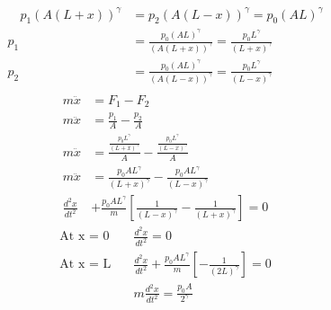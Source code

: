 \documentclass[]{article}
\begin{document}
{\begin{enumerate}
\begin{enumerate}
\begin{equation*}
\begin{split}
							\quad p_1 (A(L + x))^{\gamma} &= p_2 (A(L - x))^{\gamma} = p_0(AL)^{\gamma} \\
							p_1 &= \frac{p_0(AL)^{\gamma}}{(A(L + x))^{\gamma}} = \frac{p_0L^{\gamma}}{(L + x)^{\gamma}} \\
							p_2 &= \frac{p_0(AL)^{\gamma}}{(A(L - x))^{\gamma}} = \frac{p_0L^{\gamma}}{(L - x)^{\gamma}} \\
						\end{split}
					\end{equation*}
					\begin{equation*}
						\begin{split}
							m\ddot{x} &=  F_1 - F_2 \\
							m\ddot{x} &=  \frac{p_1}{A} - \frac{p_2}{A} \\
							m\ddot{x} &=  \frac{\frac{p_0L^{\gamma}}{(L + x)^{\gamma}}}{A} - \frac{\frac{p_0L^{\gamma}}{(L - x)^{\gamma}}}{A} \\
							m\ddot{x} &=  \frac{p_0AL^{\gamma}}{(L + x)^{\gamma}} - \frac{p_0AL^{\gamma}}{(L - x)^{\gamma}} \\
							\frac{d^2 x}{dt^2} &+ \frac{p_0 A L^{\gamma}}{m} \left[ \frac{1}{(L - x)^{\gamma}} - \frac{1}{(L + x)^{\gamma}} \right] = 0
						\end{split}
					\end{equation*}
					\begin{equation*}
						\begin{split}
							\text{At x = 0} \quad &\frac{d^2 x}{dt^2} = 0 \\
							\text{At x = L} \quad &\frac{d^2 x}{dt^2} + \frac{p_0 A L^{\gamma}}{m} \left[ - \frac{1}{(2L)^{\gamma}} \right] = 0 \\
							&m\frac{d^2 x}{dt^2} = \frac{p_0 A}{2^{\gamma}} \\
						\end{split}
					\end{equation*}
				

\end{enumerate}
\end{enumerate}}
\end{document}

